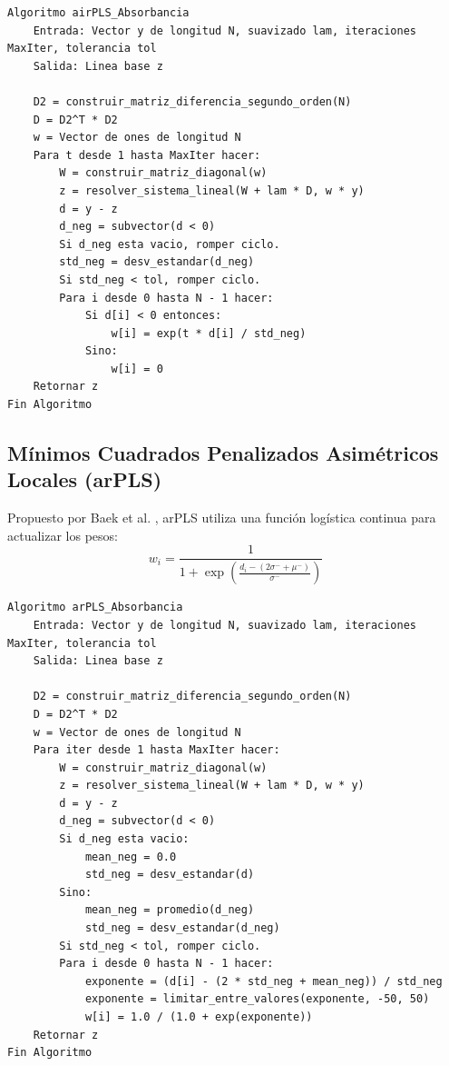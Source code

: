 \documentclass[a4paper,11pt]{article}
\begin{document}
\begin{lstlisting}[caption=Algoritmo airPLS (Absorbancia)]
Algoritmo airPLS_Absorbancia
    Entrada: Vector y de longitud N, suavizado lam, iteraciones MaxIter, tolerancia tol
    Salida: Linea base z

    D2 = construir_matriz_diferencia_segundo_orden(N)
    D = D2^T * D2
    w = Vector de ones de longitud N
    Para t desde 1 hasta MaxIter hacer:
        W = construir_matriz_diagonal(w)
        z = resolver_sistema_lineal(W + lam * D, w * y)
        d = y - z
        d_neg = subvector(d < 0)
        Si d_neg esta vacio, romper ciclo.
        std_neg = desv_estandar(d_neg)
        Si std_neg < tol, romper ciclo.
        Para i desde 0 hasta N - 1 hacer:
            Si d[i] < 0 entonces:
                w[i] = exp(t * d[i] / std_neg)
            Sino:
                w[i] = 0
    Retornar z
Fin Algoritmo
\end{lstlisting}

\subsection{Mínimos Cuadrados Penalizados Asimétricos Locales (arPLS)}
Propuesto por Baek et al. \cite{baek2015}, arPLS utiliza una función logística continua para actualizar los pesos:
\begin{equation}
    w_i = \frac{1}{1 + \exp\left( \frac{d_i - (2 \sigma^- + \mu^-)}{\sigma^-} \right)}
\end{equation}

\begin{lstlisting}[caption=Algoritmo arPLS (Absorbancia)]
Algoritmo arPLS_Absorbancia
    Entrada: Vector y de longitud N, suavizado lam, iteraciones MaxIter, tolerancia tol
    Salida: Linea base z

    D2 = construir_matriz_diferencia_segundo_orden(N)
    D = D2^T * D2
    w = Vector de ones de longitud N
    Para iter desde 1 hasta MaxIter hacer:
        W = construir_matriz_diagonal(w)
        z = resolver_sistema_lineal(W + lam * D, w * y)
        d = y - z
        d_neg = subvector(d < 0)
        Si d_neg esta vacio:
            mean_neg = 0.0
            std_neg = desv_estandar(d)
        Sino:
            mean_neg = promedio(d_neg)
            std_neg = desv_estandar(d_neg)
        Si std_neg < tol, romper ciclo.
        Para i desde 0 hasta N - 1 hacer:
            exponente = (d[i] - (2 * std_neg + mean_neg)) / std_neg
            exponente = limitar_entre_valores(exponente, -50, 50)
            w[i] = 1.0 / (1.0 + exp(exponente))
    Retornar z
Fin Algoritmo
\end{lstlisting}
\end{document}
